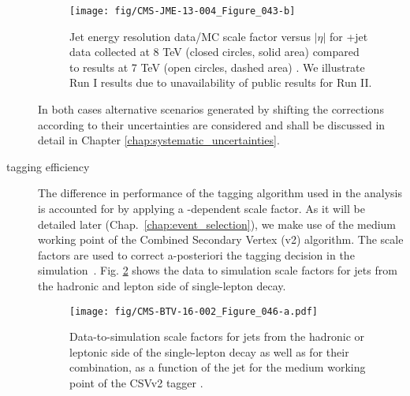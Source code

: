 \begin{description}
\begin{figure}[htp]
\centering
  \def\twidth{0.45}
  \centering
    \texttt{[image: fig/CMS-JME-13-004\_Figure\_043-b]}
  \caption{Jet energy resolution data/MC scale factor versus $\left|\eta\right|$ for \cPgg+jet data collected at 8 TeV (closed circles, solid area) compared to results at 7 TeV (open circles, dashed area) \cite{Khachatryan:2016kdb}. We illustrate Run I results due to unavailability of public results for Run II.}
  \label{fig:CMS-JME-13-004_Figure_041}
\end{figure}

In both cases alternative scenarios generated by shifting the corrections according to their uncertainties are considered and shall be discussed in detail in Chapter \ref{chap:systematic_uncertainties}.


\item[\cPqb tagging efficiency]

The difference in performance of the \cPqb tagging algorithm used in the analysis is accounted for by applying a \pt-dependent scale factor. As it will be detailed later (Chap.~\ref{chap:event_selection}), we make use of the medium working point of the Combined Secondary Vertex (v2) algorithm. The scale factors are used to correct a-posteriori the \cPqb tagging decision in the simulation~\cite{twiki:BTV}. Fig. \ref{fig:btag_sf} shows the data to simulation scale factors for \cPqb jets from the hadronic and lepton side of single-lepton \ttbar decay.

\begin{figure}[htp]
\centering
  \def\twidth{0.45}
  \centering
    \texttt{[image: fig/CMS-BTV-16-002\_Figure\_046-a.pdf]}
\caption{Data-to-simulation scale factors for \cPqb jets from the hadronic or leptonic side of the single-lepton \ttbar decay as well as for their combination, as a function of the jet \pt for the medium working point of the CSVv2 tagger \cite{Sirunyan:2017ezt}. }
\label{fig:btag_sf}
\end{figure}


\end{description}

